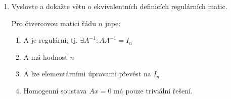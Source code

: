 \documentclass[10pt,a4paper]{article}
\begin{document}
\begin{enumerate}
kde $p_i \in \mathbb{R}$ a $x_j$ jsou vhodné řešení soustavy $Ax =0$

Soustava má pouze triviální řešení $x = 0$ právě tehdy, když A je hodnosti $n$.

Důsledek: Obecné řešení soustavy $Ax = b$ lze vyjádřit ve tvaru:

\begin{equation*}
x = x_0 +p_1x_1 + p_2x_2 + ... + p_{n - r}x_{n-r}
\end{equation*}

kde $x_0$ je libovolné řešení soustavy $Ax = b$, $r$ je hodnost A, $p_i \in \mathbb{R}$ a $x_j$ jsou vhodné řešení soustavy $Ax =0$

\begin{proof}
Řešení získané zpětnou substitucí závisí na $n-r$ hodnotách volných proměnných. Označme je parametry $p_1, ..., p_{n-r}$.

Potom řešení x lze vyjádřit 	lineárním výrazem:

\begin{equation*}
\begin{array}{c}
x_1 = \alpha_{11}p_1 + ... + \alpha_{1, n-r}p_{n-r} \\
\vdots \\
x_n = \alpha_{n1}p_1 + ... + \alpha_{n, n-r}p_{n-r} \\
\end{array}
\end{equation*}

Označíme $x_1 = (\alpha_{11}, ..., \alpha_{n,1})^T ... x_{n-r} = (\alpha_{1,n-r}, ..., \alpha_{n,n-r})^T $

Tyto vektory ale zároveň řeší soustavu $Ax = 0$, protože libovolné $x^i$ lze získat volbou parametrů $p_i = 1, p_j = 0, j \neq i$

Druhá část věty: (není nutno dokázat)
$rank(A) = n \iff$ soustava nemá volné proměnné $\iff$ existuje právě jedno řešení soustavy $Ax =0$, a to $x = 0$. 

Důkaz důsledku: Použijeme bijekci mezi řešeními (předchozí věta).	

\end{proof}

\item Vyslovte a dokažte větu o ekvivalentních definicích regulárních matic. 

Pro čtvercovou matici řádu $n$ jnpe: 
\begin{enumerate}[label=\arabic*]
\item A je regulární, tj. $\exists A^{-1}: AA^{-1} = I_n$
\item A má hodnost $n$
\item A lze elementárními úpravami převést na $I_n$
\item Homogenní soustava $Ax = 0$ má pouze triviální řešení.
\end{enumerate}


\end{enumerate}
\end{document}
